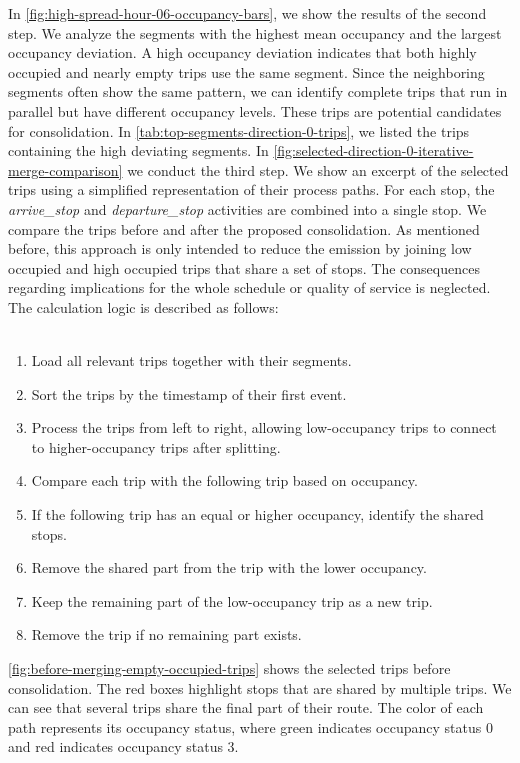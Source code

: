 In \autoref{fig:high-spread-hour-06-occupancy-bars}, we show the results of the second step. We analyze the segments with the highest mean occupancy and the largest occupancy deviation. A high occupancy deviation indicates that both highly occupied and nearly empty trips use the same segment. Since the neighboring segments often show the same pattern, we can identify complete trips that run in parallel but have different occupancy levels. These trips are potential candidates for consolidation. In \autoref{tab:top-segments-direction-0-trips}, we listed the trips containing the high deviating segments. 
In \autoref{fig:selected-direction-0-iterative-merge-comparison} we conduct the third step. We show an excerpt of the selected trips using a simplified representation of their process paths. For each stop, the \textit{arrive\_stop} and \textit{departure\_stop} activities are combined into a single stop. We compare the trips before and after the proposed consolidation. As mentioned before, this approach is only intended to reduce the emission by joining low occupied and high occupied trips that share a set of stops. The consequences regarding implications for the whole schedule or quality of service is neglected. The calculation logic is described as follows: 
\\ \\
\noindent
\begin{minipage}{\textwidth}
\begin{enumerate}
    \item Load all relevant trips together with their segments.
    \item Sort the trips by the timestamp of their first event.
    \item Process the trips from left to right, allowing low-occupancy trips to connect to higher-occupancy trips after splitting.
    \item Compare each trip with the following trip based on occupancy.
    \item If the following trip has an equal or higher occupancy, identify the shared stops.
    \item Remove the shared part from the trip with the lower occupancy.
    \item Keep the remaining part of the low-occupancy trip as a new trip.
    \item Remove the trip if no remaining part exists.
    \vspace{0.5cm}
\end{enumerate}
\end{minipage}
\autoref{fig:before-merging-empty-occupied-trips} shows the selected trips before consolidation. The red boxes highlight stops that are shared by multiple trips. We can see that several trips share the final part of their route. The color of each path represents its occupancy status, where green indicates occupancy status 0 and red indicates occupancy status 3.

